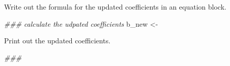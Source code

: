 \documentclass[
]{article}
\newenvironment{Shaded}{\begin{snugshade}}{\end{snugshade}}
\newcommand{\CommentTok}[1]{\textcolor[rgb]{0.56,0.35,0.01}{\textit{#1}}}
\newcommand{\NormalTok}[1]{#1}
\newcommand{\StringTok}[1]{\textcolor[rgb]{0.31,0.60,0.02}{#1}}
\begin{document}
Write out the formula for the updated coefficients in an equation block.

\begin{Shaded}
\begin{Highlighting}[]
\CommentTok{### calculate the udpated coefficients}
\NormalTok{b_new <-}\StringTok{ }
\end{Highlighting}
\end{Shaded}

Print out the updated coefficients.

\begin{Shaded}
\begin{Highlighting}[]
\CommentTok{### }
\end{Highlighting}
\end{Shaded}
\end{document}

